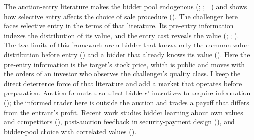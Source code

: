 The auction-entry literature makes the bidder pool endogenous (; ; ; ) and shows how selective entry affects the choice of sale procedure (). The challenger here faces selective entry in the terms of that literature. Its pre-entry information indexes the distribution of its value, and the entry cost reveals the value (; ; ). The two limits of this framework are a bidder that knows only the common value distribution before entry () and a bidder that already knows its value (). Here the pre-entry information is the target's stock price, which is public and moves with the orders of an investor who observes the challenger's quality class. I keep the direct deterrence force of that literature and add a market that operates before preparation. Auction formats also affect bidders' incentives to acquire information (); the informed trader here is outside the auction and trades a payoff that differs from the entrant's profit. Recent work studies bidder learning about own values and competitors (), post-auction feedback in security-payment design (), and bidder-pool choice with correlated values ().
